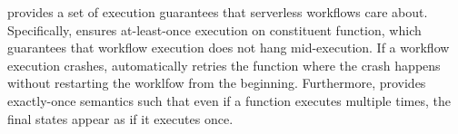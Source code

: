 




\name{} provides a set of execution guarantees that serverless workflows care
about. Specifically, \name{} ensures at-least-once execution on constituent
function, which guarantees that workflow execution does not hang
mid-execution. If a workflow execution crashes, \name{} automatically retries
the function where the crash happens without restarting the worklfow from the
beginning. Furthermore, \name{} provides exactly-once semantics such that even
if a function executes multiple times, the final states appear as if it
executes once.


